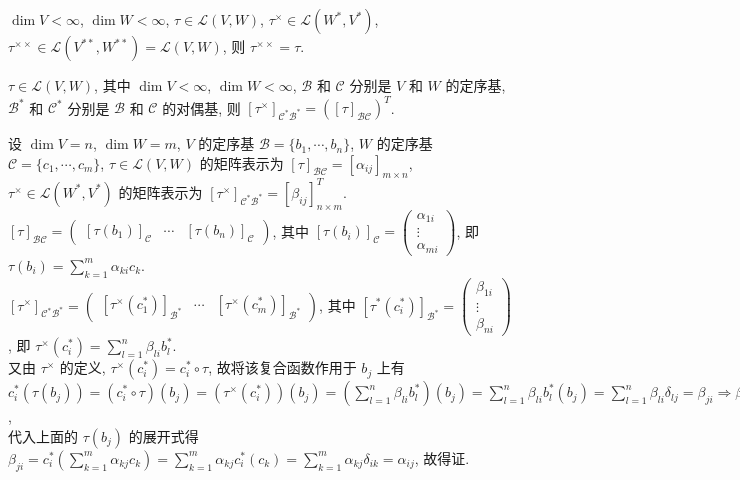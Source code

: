 \documentclass{note}
\begin{document}
\begin{thm}[(课本定理 3.18)]
    $\dim V<\infty$, $\dim W<\infty$, $\tau\in\mathcal{L}(V,W)$, $\tau^{\times}\in\mathcal{L}(W^*,V^*)$, $\tau^{\times\times}\in\mathcal{L}(V^{**},W^{**})=\mathcal{L}(V,W)$, 则 $\tau^{\times\times}=\tau$.
\end{thm}

\begin{thm}[(课本定理 3.22)]
    $\tau\in\mathcal{L}(V,W)$, 其中 $\dim V<\infty$, $\dim W<\infty$, $\mathcal{B}$ 和 $\mathcal{C}$ 分别是 $V$ 和 $W$ 的定序基, $\mathcal{B}^*$ 和 $\mathcal{C}^*$ 分别是 $\mathcal{B}$ 和 $\mathcal{C}$ 的对偶基, 则 $[\tau^{\times}]_{\mathcal{C^*B^*}}=([\tau]_{\mathcal{BC}})^T$.
\end{thm}
\begin{pf}
    设 $\dim V=n$, $\dim W=m$, $V$ 的定序基 $\mathcal{B}=\{b_1,\cdots,b_n\}$, $W$ 的定序基 $\mathcal{C}=\{c_1,\cdots,c_m\}$, $\tau\in\mathcal{L}(V,W)$ 的矩阵表示为 $[\tau]_{\mathcal{BC}}=[\alpha_{ij}]_{m\times n}$, $\tau^{\times}\in\mathcal{L}(W^*,V^*)$ 的矩阵表示为 $[\tau^{\times}]_{\mathcal{C^*B^*}}=[\beta_{ij}]_{n\times m}^T$.\\
    $[\tau]_{\mathcal{BC}}=\begin{pmatrix}
        [\tau(b_1)]_{\mathcal{C}}&\cdots&[\tau(b_n)]_{\mathcal{C}}
    \end{pmatrix}$, 其中 $[\tau(b_i)]_{\mathcal{C}}=\begin{pmatrix}
        \alpha_{1i}\\
        \vdots\\
        \alpha_{mi}
    \end{pmatrix}$, 即 $\tau(b_i)=\sum_{k=1}^m\alpha_{ki}c_k$.\\
    $[\tau^{\times}]_{\mathcal{C^*B^*}}=\begin{pmatrix}
        [\tau^{\times}(c_1^*)]_{\mathcal{B^*}}&\cdots&[\tau^{\times}(c_m^*)]_{\mathcal{B^*}}
    \end{pmatrix}$, 其中 $[\tau^*(c_i^*)]_{\mathcal{B}^*}=\begin{pmatrix}
        \beta_{1i}\\
        \vdots\\
        \beta_{ni}
    \end{pmatrix}$, 即 $\tau^{\times}(c_i^*)=\sum_{l=1}^n\beta_{li}b_l^*$.\\
    又由 $\tau^{\times}$ 的定义, $\tau^{\times}(c_i^*)=c_i^*\circ\tau$, 故将该复合函数作用于 $b_j$ 上有 $c_i^*(\tau(b_j))=(c_i^*\circ\tau)(b_j)=(\tau^{\times}(c_i^*))(b_j)=\left(\sum_{l=1}^n\beta_{li}b_l^*\right)(b_j)=\sum_{l=1}^n\beta_{li}b_l^*(b_j)=\sum_{l=1}^n\beta_{li}\delta_{lj}=\beta_{ji}\Longrightarrow\beta_{ji}=c_i^*(\tau(b_j))$,\\
    代入上面的 $\tau(b_j)$ 的展开式得 $\beta_{ji}=c_i^*\left(\sum_{k=1}^m\alpha_{kj}c_k\right)=\sum_{k=1}^m\alpha_{kj}c_i^*(c_k)=\sum_{k=1}^m\alpha_{kj}\delta_{ik}=\alpha_{ij}$, 故得证.
\end{pf}
\ifx\allfiles\undefined
\end{document}
